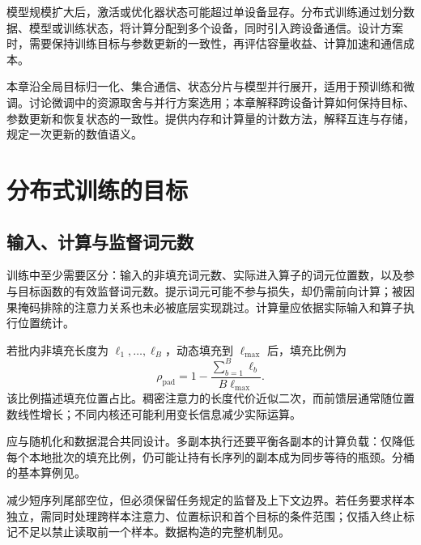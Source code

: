 \documentclass[../textbook.tex]{subfiles}
\begin{document}
\fi
{}

模型规模扩大后，激活或优化器状态可能超过单设备显存。分布式训练通过划分数据、模型或训练状态，将计算分配到多个设备，同时引入跨设备通信。设计方案时，需要保持训练目标与参数更新的一致性，再评估容量收益、计算加速和通信成本。

本章沿全局目标归一化、集合通信、状态分片与模型并行展开，适用于预训练和微调。讨论微调中的资源取舍与并行方案选用；本章解释跨设备计算如何保持目标、参数更新和恢复状态的一致性。提供内存和计算量的计数方法，解释互连与存储，规定一次更新的数值语义。

\section{分布式训练的目标}

\subsection{输入、计算与监督词元数}
训练中至少需要区分：输入的非填充词元数、实际进入算子的词元位置数，以及参与目标函数的有效监督词元数。提示词元可能不参与损失，却仍需前向计算；被因果掩码排除的注意力关系也未必被底层实现跳过。计算量应依据实际输入和算子执行位置统计。

若批内非填充长度为 $\ell_1,\ldots,\ell_B$，动态填充到 $\ell_{\max}$ 后，填充比例为
\begin{equation}
 \rho_{\mathrm{pad}}=1-\frac{\sum_{b=1}^B\ell_b}{B\ell_{\max}}.
 \label{eq:dist-padding}
\end{equation}
该比例描述填充位置占比。稠密注意力的长度代价近似二次，而前馈层通常随位置数线性增长；不同内核还可能利用变长信息减少实际运算。

应与随机化和数据混合共同设计。多副本执行还要平衡各副本的计算负载：仅降低每个本地批次的填充比例，仍可能让持有长序列的副本成为同步等待的瓶颈。分桶的基本算例见。

减少短序列尾部空位，但必须保留任务规定的监督及上下文边界。若任务要求样本独立，需同时处理跨样本注意力、位置标识和首个目标的条件范围；仅插入终止标记不足以禁止读取前一个样本。数据构造的完整机制见。
\end{document}
